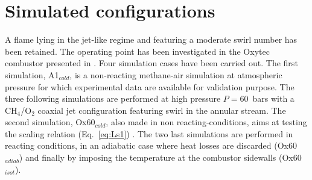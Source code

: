 \documentclass[twocolumn,10pt]{asme2e}
\begin{document}
\begin{comment}
\begin{figure*}
   \centering
   \begin{subfigure}[b]{0.28\linewidth}        %
       \centering
       \texttt{[image: fig/uz\_exp.png]}
       \caption{ experimental }
   \end{subfigure}
   \begin{subfigure}[b]{0.28\linewidth}        %
       \centering
       \texttt{[image: fig/uz\_num1.png]}
       \caption{ Mesh1 }
   \end{subfigure}
   \begin{subfigure}[b]{0.28\linewidth}        %
       \centering
       \texttt{[image: fig/uz\_num2.png]}
       \caption{ Mesh refined }
   \end{subfigure}
   \caption{comparison of 2D fields of the axial velocity $u_z$ above the injector. $z$ is the axial dimension, $x$ the radial dimension and $d_1$ the inner diameter}
   \label{fig:fields-uz}
   \vspace{-0.05 cm}
\end{figure*} 
\end{comment}


\section*{Simulated configurations}

A flame lying in the jet-like regime and featuring a moderate swirl number has been retained. The operating point has been investigated in the Oxytec combustor presented in \cite{degeneve2019scaling,degeneve2019effects}. Four simulation cases have been carried out. The first simulation, A1$_{cold}$, is a non-reacting methane-air simulation at atmospheric pressure for which experimental data are available for validation purpose. The three following simulations are performed at high pressure $P=60$~bars with a CH$_4$/O$_2$ coaxial jet configuration featuring swirl in the annular stream. The second simulation, Ox60$_{cold}$, also made in non reacting-conditions, aims at testing the scaling relation (Eq.~\ref{eq:Ls1}) \cite{degeneve2019scaling}. The two last simulations are performed in reacting conditions, in an adiabatic case where heat losses are discarded (Ox60$_{adiab}$) and finally by imposing the temperature at the combustor sidewalls (Ox60$_{isot}$).
   
\end{document}
